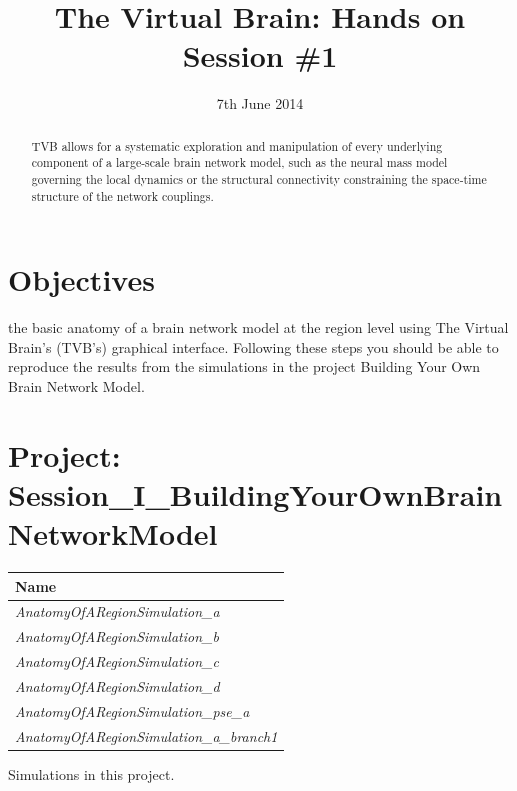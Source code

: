 \documentclass{tufte-handout}
\title{The Virtual Brain: Hands on Session \#1}
\date{7th June 2014}
\begin{document}

\newpage
\ClearWallPaper
\begin{abstract}
\noindent TVB allows for a systematic exploration and manipulation of every
underlying component of a large-scale brain network model, such as the neural
mass model governing the local dynamics  or the structural connectivity
constraining the space-time structure of the network couplings.
\begin{marginfigure}%
  \label{fig:marginfig}
\end{marginfigure}
\end{abstract}



\section{Objectives}\label{sec:objectives}

 the basic anatomy of a brain network model at the region level using The
Virtual Brain's (TVB's) graphical interface. Following these steps you should
be able to reproduce the results from the simulations in the project Building
Your Own Brain Network Model.

\section{Project:  Session\_I\_BuildingYourOwnBrainNetworkModel}\label{sec:project_data}

\begin{margintable}
  \centering
  \selectfont
  \begin{tabular}{l}
    \toprule
    Name \\
    \midrule
    \textit{AnatomyOfARegionSimulation\_a} \\
    \textit{AnatomyOfARegionSimulation\_b}  \\ 
    \textit{AnatomyOfARegionSimulation\_c}  \\ 
    \textit{AnatomyOfARegionSimulation\_d}  \\ 
    \textit{AnatomyOfARegionSimulation\_pse\_a} \\
    \textit{AnatomyOfARegionSimulation\_a\_branch1} \\
    \bottomrule
  \end{tabular}
  \caption{Simulations in this project.}
  \label{tab:normaltab}
\end{margintable}
\end{document}
